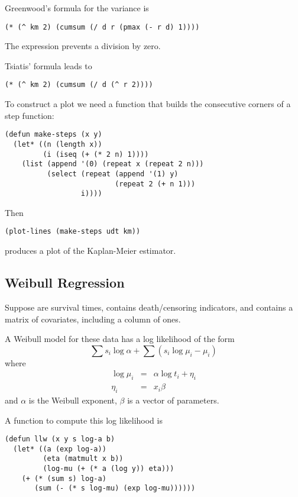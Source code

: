 \begin{slide}{}
Greenwood's formula for the variance is
{\Large
\begin{verbatim}
(* (^ km 2) (cumsum (/ d r (pmax (- r d) 1))))
\end{verbatim}}
The  expression prevents a division by zero.

Tsiatis' formula leads to
{\Large
\begin{verbatim}
(* (^ km 2) (cumsum (/ d (^ r 2))))
\end{verbatim}}

To construct a plot we need a function that builds the consecutive
corners of a step function:
{\Large
\begin{verbatim}
(defun make-steps (x y)
  (let* ((n (length x))
         (i (iseq (+ (* 2 n) 1))))
    (list (append '(0) (repeat x (repeat 2 n)))
          (select (repeat (append '(1) y)
                          (repeat 2 (+ n 1)))
                  i))))
\end{verbatim}}
Then
{\Large
\begin{verbatim}
(plot-lines (make-steps udt km))
\end{verbatim}}
produces a plot of the Kaplan-Meier estimator.
\end{slide}

\begin{slide}{}
\subsection{Weibull Regression}
Suppose  are survival times,  contains
death/censoring indicators, and  contains a matrix of
covariates, including a column of ones.

A Weibull model for these data has a log likelihood of the form
\begin{displaymath}
\sum s_{i} \log \alpha + \sum (s_{i}\log \mu_{i}-\mu_{i})
\end{displaymath}
where
\begin{eqnarray*}
\log \mu_{i} & = & \alpha \log t_{i} + \eta_{i}\\
\eta_{i} & = & x_{i} \beta
\end{eqnarray*}
and $\alpha$ is the Weibull exponent, $\beta$ is a vector of
parameters.

A function to compute this log likelihood is
{\Large
\begin{verbatim}
(defun llw (x y s log-a b)
  (let* ((a (exp log-a))
         (eta (matmult x b))
         (log-mu (+ (* a (log y)) eta)))
    (+ (* (sum s) log-a)
       (sum (- (* s log-mu) (exp log-mu))))))
\end{verbatim}}
\end{slide}


